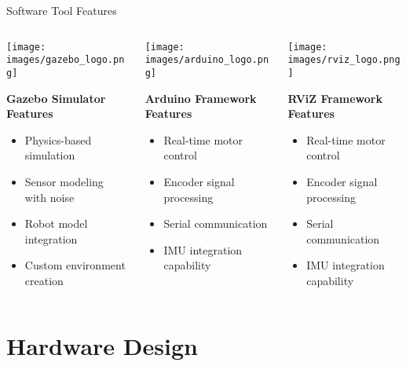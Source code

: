\documentclass[aspectratio=169]{beamer}
\newcommand{\reducefontsize}{\fontsize{7}{9}\selectfont}
\begin{document}
\begin{frame}{Software Tool Features}
		\vspace{0.5cm}
		\begin{columns}
			\begin{column}{0.3\textwidth}
				\centering
					\texttt{[image: images/gazebo\_logo.png]}\\
        {\reducefontsize%
        \centering
				\textbf{Gazebo Simulator Features}
				\begin{itemize}
					\item Physics-based simulation
					\item Sensor modeling with noise
					\item Robot model integration
					\item Custom environment creation
				\end{itemize}
        }
			\end{column}
			\begin{column}{0.3\textwidth}
				\centering
					\texttt{[image: images/arduino\_logo.png]}\\
        {\reducefontsize%
        \centering
				\textbf{Arduino Framework Features}
				\begin{itemize}
					\item Real-time motor control
					\item Encoder signal processing
					\item Serial communication
					\item IMU integration capability
				\end{itemize}
        } 
			\end{column}
      \begin{column}{0.3\textwidth}
				\centering
					\texttt{[image: images/rviz\_logo.png]}\\
        {\reducefontsize%
        \centering
				\textbf{RViZ Framework Features}
				\begin{itemize}
					\item Real-time motor control
					\item Encoder signal processing
					\item Serial communication
					\item IMU integration capability
				\end{itemize}
        } 
			\end{column}
		\end{columns}
\end{frame}

\section{Hardware Design}
\end{document}
